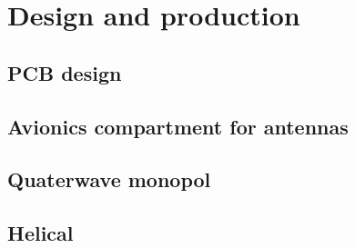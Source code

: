 \chapter{Design and production}

\section{PCB design}
\section{Avionics compartment for antennas}
\section{Quaterwave monopol}
\section{Helical}
